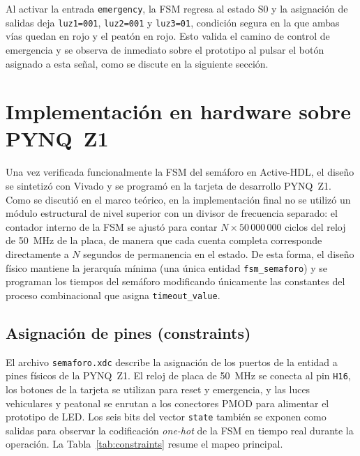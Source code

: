 \documentclass[12pt,letterpaper]{article}
\begin{document}
Al activar la entrada \texttt{emergency}, la FSM regresa al estado S0 y la asignación de salidas deja \texttt{luz1=001}, \texttt{luz2=001} y \texttt{luz3=01}, condición segura en la que ambas vías quedan en rojo y el peatón en rojo. Esto valida el camino de control de emergencia y se observa de inmediato sobre el prototipo al pulsar el botón asignado a esta señal, como se discute en la siguiente sección.

\section{Implementación en hardware sobre PYNQ~Z1}

Una vez verificada funcionalmente la FSM del semáforo en Active-HDL, el diseño se sintetizó con Vivado y se programó en la tarjeta de desarrollo PYNQ~Z1. Como se discutió en el marco teórico, en la implementación final no se utilizó un módulo estructural de nivel superior con un divisor de frecuencia separado: el contador interno de la FSM se ajustó para contar $N \times 50\,000\,000$ ciclos del reloj de \SI{50}{\mega\hertz} de la placa, de manera que cada cuenta completa corresponde directamente a $N$ segundos de permanencia en el estado. De esta forma, el diseño físico mantiene la jerarquía mínima (una única entidad \texttt{fsm\_semaforo}) y se programan los tiempos del semáforo modificando únicamente las constantes del proceso combinacional que asigna \texttt{timeout\_value}.

\subsection{Asignación de pines (constraints)}
El archivo \texttt{semaforo.xdc} describe la asignación de los puertos de la entidad a pines físicos de la PYNQ~Z1. El reloj de placa de \SI{50}{\mega\hertz} se conecta al pin \texttt{H16}, los botones de la tarjeta se utilizan para reset y emergencia, y las luces vehiculares y peatonal se enrutan a los conectores PMOD para alimentar el prototipo de LED. Los seis bits del vector \texttt{state} también se exponen como salidas para observar la codificación \textit{one-hot} de la FSM en tiempo real durante la operación. La Tabla~\ref{tab:constraints} resume el mapeo principal.
\end{document}
